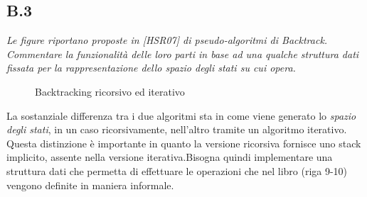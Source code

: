 \documentclass[a4paper]{article}
\begin{document}
\subsection{B.3}
\emph{Le figure riportano proposte in [HSR07] di pseudo-algoritmi di Backtrack. Commentare la funzionalità delle loro parti in base ad una qualche struttura dati fissata per la rappresentazione dello spazio degli stati su cui opera.}
\begin{figure}[!ht]
\centering
{}
\caption{Backtracking ricorsivo ed iterativo} \label{FIG:B3_algorithms}
\end{figure}
La sostanziale differenza tra i due algoritmi sta in come viene generato lo \textit{spazio degli stati}, in un caso ricorsivamente, nell'altro tramite un algoritmo iterativo.\\
Questa distinzione è importante in quanto la versione ricorsiva fornisce uno stack implicito, assente nella versione iterativa.Bisogna quindi implementare una struttura dati che permetta di effettuare le operazioni che nel libro (riga 9-10) vengono definite in maniera informale.
\end{document}

